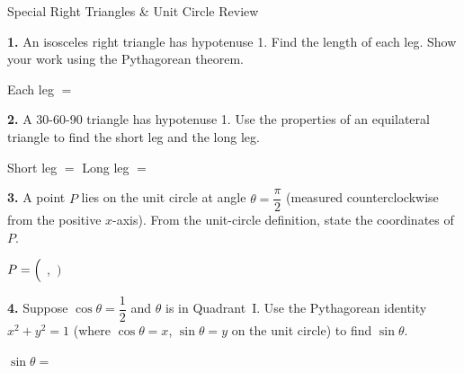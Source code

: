\documentclass[10pt]{article}
\begin{document}
\namedateperiod

\vspace{0.12in}

\begin{notesbox}{Special Right Triangles \& Unit Circle Review}

\textbf{1.} An isosceles right triangle has hypotenuse 1. Find the length of each leg.
Show your work using the Pythagorean theorem.

\vspace{0.55in}

Each leg $= $ \underline{\hspace{1.8cm}}

\vspace{0.18in}

\textbf{2.} A 30-60-90 triangle has hypotenuse 1. Use the properties of an equilateral
triangle to find the short leg and the long leg.

\vspace{0.55in}

Short leg $= $ \underline{\hspace{1.8cm}} \qquad Long leg $= $ \underline{\hspace{1.8cm}}

\vspace{0.18in}

\textbf{3.} A point $P$ lies on the unit circle at angle $\theta = \dfrac{\pi}{2}$ (measured
counterclockwise from the positive $x$-axis). From the unit-circle definition, state the
coordinates of $P$.

\vspace{0.4in}

$P = \Bigl($ \underline{\hspace{1.2cm}} $,$ \underline{\hspace{1.2cm}} $\Bigr)$

\vspace{0.18in}

\textbf{4.} Suppose $\cos\theta = \dfrac{1}{2}$ and $\theta$ is in Quadrant~I.
Use the Pythagorean identity $x^2 + y^2 = 1$ (where $\cos\theta = x$, $\sin\theta = y$
on the unit circle) to find $\sin\theta$.

\vspace{0.55in}

$\sin\theta = $ \underline{\hspace{1.8cm}}

\end{notesbox}
\end{document}
